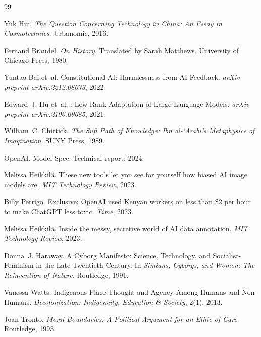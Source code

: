 \documentclass[12pt,a4paper]{article}
\begin{document}

\begin{thebibliography}{99}

Yuk Hui.
\newblock \emph{The Question Concerning Technology in China: An Essay in Cosmotechnics}.
\newblock Urbanomic, 2016.

Fernand Braudel.
\newblock \emph{On History}.
\newblock Translated by Sarah Matthews. University of Chicago Press, 1980.

Yuntao Bai et~al.
\newblock Constitutional {AI}: Harmlessness from {AI}-Feedback.
\newblock \emph{arXiv preprint arXiv:2212.08073}, 2022.

Edward~J. Hu et~al.
: Low-Rank Adaptation of Large Language Models.
\newblock \emph{arXiv preprint arXiv:2106.09685}, 2021.

William~C. Chittick.
\newblock \emph{The Sufi Path of Knowledge: Ibn al-`Arab\={\i}'s Metaphysics of Imagination}.
\newblock SUNY Press, 1989.

OpenAI.
 {Model} {Spec}.
\newblock Technical report, 2024.

Melissa Heikkil{\"a}.
\newblock These new tools let you see for yourself how biased {AI} image models are.
\newblock \emph{MIT Technology Review}, 2023.

Billy Perrigo.
\newblock Exclusive: {OpenAI} used Kenyan workers on less than \$2 per hour to make {ChatGPT} less toxic.
\newblock \emph{Time}, 2023.

Melissa Heikkil{\"a}.
\newblock Inside the messy, secretive world of {AI} data annotation.
\newblock \emph{MIT Technology Review}, 2023.

Donna~J. Haraway.
\newblock A Cyborg Manifesto: Science, Technology, and Socialist-Feminism in the Late Twentieth Century.
\newblock In \emph{Simians, Cyborgs, and Women: The Reinvention of Nature}. Routledge, 1991.

Vanessa Watts.
\newblock Indigenous Place-Thought and Agency Among Humans and Non-Humans.
\newblock \emph{Decolonization: Indigeneity, Education \& Society}, 2(1), 2013.

Joan Tronto.
\newblock \emph{Moral Boundaries: A Political Argument for an Ethic of Care}.
\newblock Routledge, 1993.

\end{thebibliography}
\end{document}
